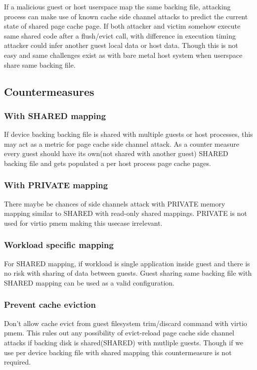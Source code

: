 If a malicious guest or host userspace map the same backing file,
attacking process can make use of known cache side channel attacks
to predict the current state of shared page cache page. If both
attacker and victim somehow execute same shared code after a
flush/evict call, with difference in execution timing attacker
could infer another guest local data or host data. Though this is
not easy and same challenges exist as with bare metal host system
when userspace share same backing file.

\subsection{Countermeasures}\label{sec:Device Types / PMEM Device / Possible Security Implications / Countermeasures}

\subsubsection{ With SHARED mapping}\label{sec:Device Types / PMEM Device / Possible Security Implications / Countermeasures / SHARED}

If device backing backing file is shared with multiple guests or host
processes, this may act as a metric for page cache side channel attack.
As a counter measure every guest should have its own(not shared with
another guest) SHARED backing file and gets populated a per host process
page cache pages.

\subsubsection{ With PRIVATE mapping}\label{sec:Device Types / PMEM Device / Possible Security Implications / Countermeasures / PRIVATE}
There maybe be chances of side channels attack with PRIVATE
memory mapping similar to SHARED with read-only shared mappings.
PRIVATE is not used for virtio pmem making this usecase
irrelevant.

\subsubsection{ Workload specific mapping}\label{sec:Device Types / PMEM Device / Possible Security Implications / Countermeasures / Workload}
For SHARED mapping, if workload is single application inside
guest and there is no risk with sharing of data between guests.
Guest sharing same backing file with SHARED mapping can be
used as a valid configuration.

\subsubsection{ Prevent cache eviction}\label{sec:Device Types / PMEM Device / Possible Security Implications / Countermeasures / Cache eviction}
Don't allow cache evict from guest filesystem trim/discard command
with virtio pmem. This rules out any possibility of evict-reload
page cache side channel attacks if backing disk is shared(SHARED)
with mutliple guests. Though if we use per device backing file with
shared mapping this countermeasure is not required.
